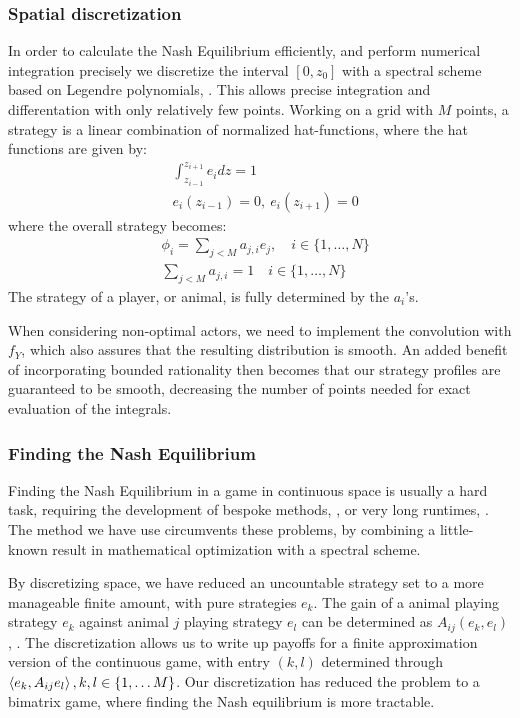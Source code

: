 \subsubsection*{Spatial discretization}
In order to calculate the Nash Equilibrium efficiently, and perform numerical integration precisely we discretize the interval $[0,z_0]$ with a spectral scheme based on Legendre polynomials, \citep{kopriva2009implementing}. This allows precise integration and differentation with only relatively few points. Working on a grid with $M$ points, a strategy is a linear combination of normalized hat-functions, where the hat functions are given by:
\begin{align*}
	& \int_{z_{i-1}}^{z_{i+1}} e_i dz = 1 \\
	&e_i(z_{i-1}) = 0,~ e_i(z_{i+1}) = 0
\end{align*}
where the overall strategy becomes:
\begin{align*}
  &\phi_{i} = \sum_{j<M} a_{j,i} e_j, \quad i\in \{1,\dots, N\} \\
  &\sum_{j<M} a_{j,i} = 1 \quad i\in \{1,\dots, N\}
\end{align*}
The strategy of a player, or animal, is fully determined by the $a_i$'s.


When considering non-optimal actors, we need to implement the convolution with $f_Y$, which also assures that the resulting distribution is smooth. An added benefit of incorporating bounded rationality then becomes that our strategy profiles are guaranteed to be smooth, decreasing the number of points needed for exact evaluation of the integrals.


\subsubsection*{Finding the Nash Equilibrium}
Finding the Nash Equilibrium in a game in continuous space is usually a hard task, requiring the development of bespoke methods, \citep{verticalmigration}, or very long runtimes, \citep{jerome}. The method we have use circumvents these problems, by combining a little-known result in mathematical optimization with a spectral scheme.

By discretizing space, we have reduced an uncountable strategy set to a more manageable finite amount, with pure strategies $e_k$. The gain of a animal playing strategy $e_k$ against animal $j$ playing strategy $e_l$ can be determined as $A_{ij}(e_k,e_l)$, . The discretization allows us to write up payoffs for a finite approximation version of the continuous game,  with entry $(k,l)$ determined through $\left \langle e_k,A_{ij}e_l \right \rangle, k,l \in \{1,\dots M\}$.
Our discretization has reduced the problem to a bimatrix game, where finding the Nash equilibrium is more tractable.

